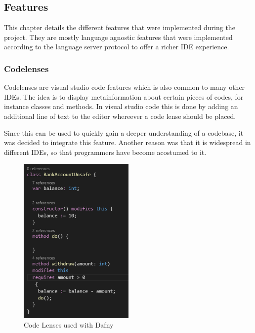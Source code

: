 \subsection{Features} \label{features}
This chapter details the different features that were implemented during the project. They are mostly language agnostic features that were implemented according to the language server protocol to offer a richer IDE experience. 

\subsubsection{Codelenses} \label{codelenses}
Codelenses are visual studio code features which is also common to many other IDEs. The idea is to display metainformation about certain pieces of codes, for instance classes and methods. In visual studio code this is done  by adding an additional line of text to the editor whereever a code lense should  be placed. \newline

Since this can be used to quickly gain a deeper understanding of a codebase, it was decided to integrate this feature. Another reason was that it is widespread in different IDEs, so that programmers have become acostumed to it. \newline

\begin{figure}[H]
	\centering
	\includegraphics[width=0.5\textwidth]{img/codelensesClosed}
	\caption{Code Lenses used with Dafny}
	\label{fig:codelensesclosed}
\end{figure}

